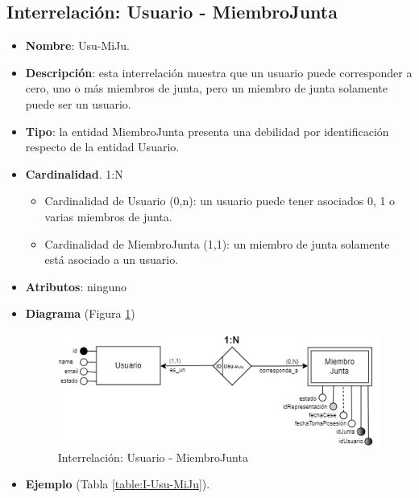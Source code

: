\subsection{Interrelación: Usuario - MiembroJunta}
\begin{itemize}
    \item \textbf{Nombre}: Usu-MiJu.
    \item \textbf{Descripción}: esta interrelación muestra que un usuario puede corresponder a cero, uno o más miembros de junta, pero un miembro de junta solamente puede ser un usuario.
    \item \textbf{Tipo}: la entidad MiembroJunta presenta una debilidad por identificación respecto de la entidad Usuario.
    \item \textbf{Cardinalidad}. 1:N
    \begin{itemize}
        \item Cardinalidad de Usuario (0,n): un usuario puede tener asociados 0, 1 o varias miembros de junta.
        \item Cardinalidad de MiembroJunta (1,1): un miembro de junta solamente está asociado a un usuario.
    \end{itemize}
    \item \textbf{Atributos}: ninguno
    \item \textbf{Diagrama} (Figura \ref{fig:I-Usu-MiJu}) 
    \begin{figure}[H]
        \centering
        \includegraphics[scale=0.7]{img/diagramas/EER/I-Usu-MiJu}
        \caption{Interrelación: Usuario - MiembroJunta}
        \label{fig:I-Usu-MiJu}
    \end{figure}
    
    \item \textbf{Ejemplo} (Tabla \ref{table:I-Usu-MiJu}).


\end{itemize}
